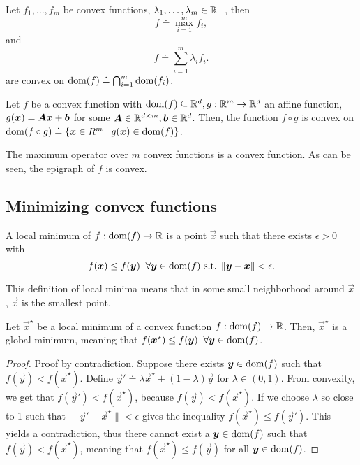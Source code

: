 \begin{observation}
    Let $f_1,\ldots,f_m$ be convex functions, $\lambda_1,\ldots,\lambda_m\in \mathbb{R}_+$, then \[
        f \doteq \max_{i=1}^m f_i,
    \]
    and \[
        f \doteq \sum_{i=1}^m \lambda_i f_i.
    \]
    are convex on $\mathrm{dom}(f) \doteq \bigcap_{i=1}^m \mathrm{dom}(f_i)$.

    Let $f$ be a convex function with $\mathrm{dom}(f) \subseteq \mathbb{R}^d, g: \mathbb{R}^m \to \mathbb{R}^d$ an affine function,
    \ie $g(\bm{x}) = \bm{A}\bm{x} + \bm{b}$ for some $\bm{A}\in \mathbb{R}^{d\times m},\bm{b}\in \mathbb{R}^d$. Then,
    the function $f \circ g$ is convex on
    $\mathrm{dom}(f \circ g) \doteq \{ \bm{x}\in R^m \mid g(\bm{x}) \in \mathrm{dom}(f) \}$.
\end{observation}

\begin{marginfigure}
    \centering
    \caption{The maximum operator over $m$ convex functions is a convex function. As can be seen, the epigraph of $f$ is convex.}
    \label{fig:max-convexity}
\end{marginfigure}

\subsection{Minimizing convex functions}

\begin{definition}
    A local minimum of $f: \mathrm{dom}(f) \to \mathbb{R}$ is a point $\vec{x}$ such that there exists $\epsilon > 0$ with \[
        f(\bm{x}) \leq f(\bm{y}) \;\; \forall \bm{y} \in \mathrm{dom}(f) \text{ s.t. } \| \bm{y}-\bm{x} \| < \epsilon.
    \]
\end{definition}

\begin{remark}
    This definition of local minima means that in some small neighborhood around $\vec{x}$, $\vec{x}$ is the smallest point.
\end{remark}

\begin{lemma}
    Let $\vec{x}^\star$ be a local minimum of a convex function $f: \mathrm{dom}(f) \to \mathbb{R}$. Then,
    $\vec{x}^\star$ is a global minimum, meaning that
    $f(\bm{x}^\star) \leq f(\bm{y}) \;\; \forall \bm{y} \in \mathrm{dom}(f)$.
\end{lemma}

\begin{proof}
    Proof by contradiction. Suppose there exists $\bm{y}\in\mathrm{dom}(f)$ such that
    $f(\vec{y}) < f(\vec{x}^\star)$. Define $\vec{y}' \doteq \lambda \vec{x}^\star + (1-\lambda) \vec{y}$
    for $\lambda\in(0,1)$. From convexity, we get that $f(\vec{y}') < f(\vec{x}^\star)$, because
    $f(\vec{y}) < f(\vec{x}^\star)$. If we choose $\lambda$ so close to 1 such that
    $\| \vec{y}' - \vec{x}^\star \| < \epsilon$ gives the inequality $f(\vec{x}^\star) \leq f(\vec{y}')$.
    This yields a contradiction, thus there cannot exist a $\bm{y}\in\mathrm{dom}(f)$ such that
    $f(\vec{y}) < f(\vec{x}^\star)$, meaning that $f(\vec{x}^\star) \leq f(\vec{y})$ for all $\bm{y}\in\mathrm{dom}(f)$.
\end{proof}


